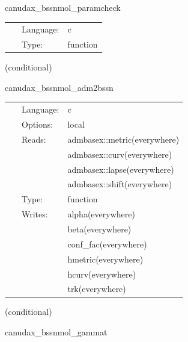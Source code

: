 \hspace{5mm} canudax\_bssnmol\_paramcheck 

\hspace{5mm}{\it check canudax\_bssnmol parameters for consistency } 


\hspace{5mm}

 \begin{tabular*}{160mm}{cll} 
~ & Language:  & c \\ 
~ & Type:  & function \\ 
\end{tabular*} 


\vspace{5mm}

   (conditional) 

\hspace{5mm} canudax\_bssnmol\_adm2bssn 

\hspace{5mm}{\it convert initial data into bssn variables } 


\hspace{5mm}

 \begin{tabular*}{160mm}{cll} 
~ & Language:  & c \\ 
~ & Options:  & local \\ 
~ & Reads:  & admbasex::metric(everywhere) \\ 
~& ~ &admbasex::curv(everywhere)\\ 
~& ~ &admbasex::lapse(everywhere)\\ 
~& ~ &admbasex::shift(everywhere)\\ 
~ & Type:  & function \\ 
~ & Writes:  & alpha(everywhere) \\ 
~& ~ &beta(everywhere)\\ 
~& ~ &conf\_fac(everywhere)\\ 
~& ~ &hmetric(everywhere)\\ 
~& ~ &hcurv(everywhere)\\ 
~& ~ &trk(everywhere)\\ 
\end{tabular*} 


\vspace{5mm}

   (conditional) 

\hspace{5mm} canudax\_bssnmol\_gammat 


